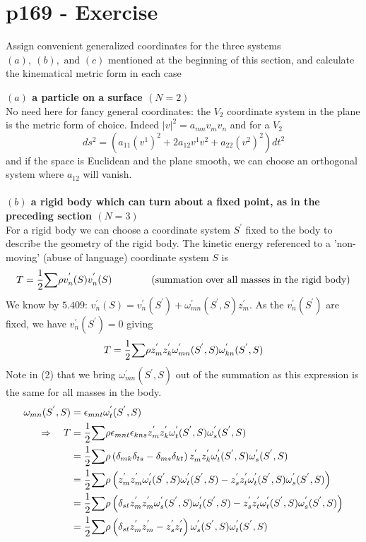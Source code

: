 \section{p169 - Exercise}
\begin{tcolorbox}
Assign convenient generalized coordinates for the three systems $(a), \ (b),\text{ and } (c)$ mentioned at the beginning of this section, and calculate the kinematical metric form in each case
\end{tcolorbox}
\textbf{$(a)$ a particle on a surface $(N=2)$}\\
No need here for fancy general coordinates: the $V_2$ coordinate system in the plane is the metric form of choice.
Indeed $\left|v\right|^2 = a_{mn}v_mv_n$ and for a $V_2$
$$ds^2 =\left(a_{11}\left(v^1\right)^2+2a_{12}v^1v^2+a_{22}\left(v^2\right)^2 \right)dt^2$$ and if the space is Euclidean and the plane smooth, we can choose an orthogonal system where $a_{12}$ will vanish.\\\\  
\textbf{$(b)$ a rigid body which can turn about a fixed point, as in the preceding section $(N=3)$}\\
For a rigid body we can choose a coordinate system $S^{'}$ fixed to the body to describe the geometry of the rigid body. The kinetic energy  referenced to a 'non-moving' (abuse of language) coordinate system $S$ is 
\begin{align}
T = \frac{1}{2}\mathbf{\sum}\rho v^{'}_n(S)v^{'}_n(S)\quad\quad\quad\quad\text{(summation over all masses in the rigid body)}
\end{align}
We know by $\mathbf{5.409}$: $v^{'}_n(S)= v^{'}_n(S^{'})+ \omega^{'}_{mn}(S^{'},S)z^{'}_m$. As the $v^{'}_n(S^{'})$ are fixed, we have $v^{'}_n(S^{'})=0$ giving 
\begin{align}
T = \frac{1}{2}\mathbf{\sum}\rho z^{'}_mz^{'}_k\omega^{'}_{mn}(S^{'},S)\omega^{'}_{kn}(S^{'},S)
\end{align}
Note in (2) that we bring $\omega^{'}_{mn}(S^{'},S)$ out of the summation as this expression  is the same for all masses in the body.
\begin{align}
\omega_{mn}(S^{'},S)&= \epsilon_{mnt}\omega^{'}_{t}(S^{'},S)\\
\Rightarrow\quad  
T &= \frac{1}{2}\mathbf{\sum}\rho \epsilon_{mnt}\epsilon_{kns}z^{'}_mz^{'}_k\omega^{'}_{t}(S^{'},S)\omega^{'}_{s}(S^{'},S)\\
&= \frac{1}{2}\mathbf{\sum}\rho \left(\delta_{mk}\delta_{ts}-\delta_{ms}\delta_{kt}\right)z^{'}_mz^{'}_k\omega^{'}_{t}(S^{'},S)\omega^{'}_{s}(S^{'},S)\\
&= \frac{1}{2}\mathbf{\sum}\rho \left(z^{'}_mz^{'}_m\omega^{'}_{t}(S^{'},S)\omega^{'}_{t}(S^{'},S)-z^{'}_sz^{'}_t\omega^{'}_{t}(S^{'},S)\omega^{'}_{s}(S^{'},S)\right)\\
&= \frac{1}{2}\mathbf{\sum}\rho \left(\delta_{st}z^{'}_mz^{'}_m\omega^{'}_{s}(S^{'},S)\omega^{'}_{t}(S^{'},S)-z^{'}_sz^{'}_t\omega^{'}_{t}(S^{'},S)\omega^{'}_{s}(S^{'},S)\right)\\
&= \frac{1}{2}\mathbf{\sum}\rho \left(\delta_{st}z^{'}_mz^{'}_m-z^{'}_sz^{'}_t\right)\omega^{'}_{s}(S^{'},S)\omega^{'}_{t}(S^{'},S)
\end{align}
